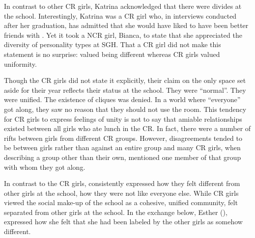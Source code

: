 \label{cliques}

\vspace{5 mm}

\noindent In contrast to other CR girls, Katrina acknowledged that there were divides at the school. Interestingly, Katrina was a CR girl who, in interviews conducted after her graduation, has admitted that she would have liked to have been better friends with .  Yet it took a NCR girl, Bianca, to state that she appreciated the diversity of personality types at SGH. That a CR girl did not make this statement is no surprise:  valued being different whereas CR girls valued uniformity.

Though the CR girls did not state it explicitly, their claim on the only space set aside for their year reflects their status at the school. They were ``normal''. They were unified. The existence of cliques was denied. In a world where ``everyone'' got along, they saw no reason that they should not use the room. This tendency for CR girls to express feelings of unity is not to say that amiable relationships existed between all girls who ate lunch in the CR. In fact, there were a number of rifts between girls from different CR groups. However, disagreements tended to be between girls rather than against an entire group and many CR girls, when describing a group other than their own, mentioned one member of that group with whom they got along.

\largerpage[-1]
In contrast to the CR girls,  consistently expressed how they felt different from other girls at the school, how they were not like everyone else. While CR girls viewed the social make-up of the school as a cohesive, unified community,  felt separated from other girls at the school. In the exchange below, Esther (), expressed how she felt that she had been labeled by the other girls as somehow different.

